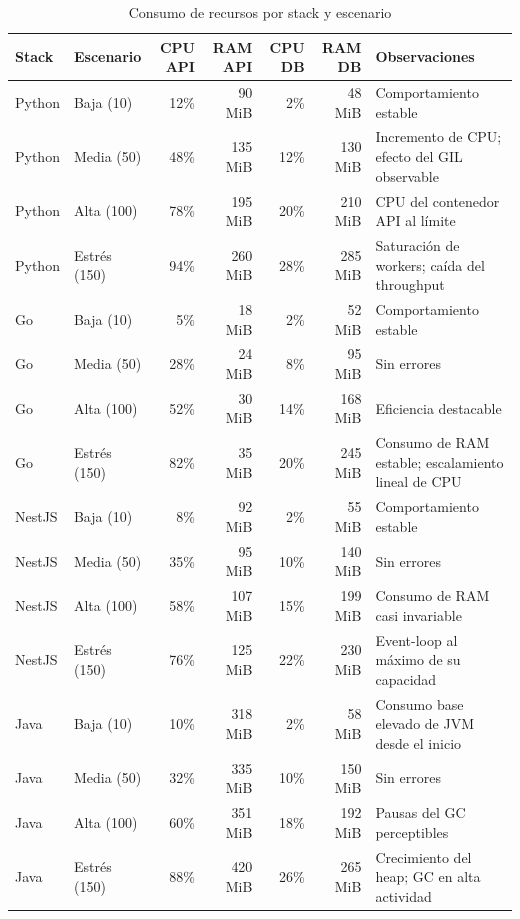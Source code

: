 \documentclass[12pt,a4paper]{article}
\begin{document}
\begin{table}[H]
\centering
\small
\begin{tabular}{llrrrrL{3.2cm}}
\toprule
\textbf{Stack} & \textbf{Escenario} & \textbf{CPU API} & \textbf{RAM API} & \textbf{CPU DB} & \textbf{RAM DB} & \textbf{Observaciones} \\
\midrule
Python & Baja (10)   & 12\% & 90 MiB  & 2\%  & 48 MiB  & Comportamiento estable \\
Python & Media (50)  & 48\% & 135 MiB & 12\% & 130 MiB & Incremento de CPU; efecto del GIL observable \\
Python & Alta (100)  & 78\% & 195 MiB & 20\% & 210 MiB & CPU del contenedor API al límite \\
Python & Estrés (150)& 94\% & 260 MiB & 28\% & 285 MiB & Saturación de workers; caída del throughput \\
\midrule
Go & Baja (10)   & 5\%  & 18 MiB  & 2\%  & 52 MiB  & Comportamiento estable \\
Go & Media (50)  & 28\% & 24 MiB  & 8\%  & 95 MiB  & Sin errores \\
Go & Alta (100)  & 52\% & 30 MiB  & 14\% & 168 MiB & Eficiencia destacable \\
Go & Estrés (150)& 82\% & 35 MiB  & 20\% & 245 MiB & Consumo de RAM estable; escalamiento lineal de CPU \\
\midrule
NestJS & Baja (10)   & 8\%  & 92 MiB  & 2\%  & 55 MiB  & Comportamiento estable \\
NestJS & Media (50)  & 35\% & 95 MiB  & 10\% & 140 MiB & Sin errores \\
NestJS & Alta (100)  & 58\% & 107 MiB & 15\% & 199 MiB & Consumo de RAM casi invariable \\
NestJS & Estrés (150)& 76\% & 125 MiB & 22\% & 230 MiB & Event-loop al máximo de su capacidad \\
\midrule
Java & Baja (10)   & 10\% & 318 MiB & 2\%  & 58 MiB  & Consumo base elevado de JVM desde el inicio \\
Java & Media (50)  & 32\% & 335 MiB & 10\% & 150 MiB & Sin errores \\
Java & Alta (100)  & 60\% & 351 MiB & 18\% & 192 MiB & Pausas del GC perceptibles \\
Java & Estrés (150)& 88\% & 420 MiB & 26\% & 265 MiB & Crecimiento del heap; GC en alta actividad \\
\bottomrule
\end{tabular}
\caption{Consumo de recursos por stack y escenario}
\end{table}
\end{document}
